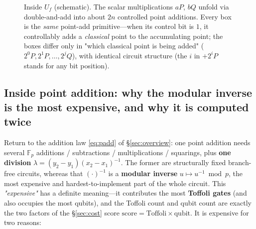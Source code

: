 \documentclass[11pt]{article}
\newcommand{\secref}[1]{\hyperref[#1]{\S\ref*{#1}}}
\begin{document}
\begin{figure}[h]
\centering
{}
\caption{Inside $U_f$ (schematic). The scalar multiplications $aP$, $bQ$ unfold via double-and-add into about $2n$ controlled point additions. Every box is the \emph{same}
point-add primitive---when its control bit is $1$, it controllably adds a \emph{classical} point to the accumulating point; the boxes differ only in "which classical point is being added" ($2^0P,2^1P,\dots,2^jQ$),
with identical circuit structure (the $i$ in $+2^iP$ stands for any bit position).}
\label{fig:oracle}
\end{figure}

\subsection{Inside point addition: why the modular inverse is the most expensive, and why it is computed twice}
\label{ssec:inv}

Return to the addition law \eqref{eq:padd} of \secref{sec:overview}: one point addition needs several $\mathbb{F}_p$ additions / subtractions / multiplications / squarings, plus \textbf{one division}
$\lambda=(y_2-y_1)(x_2-x_1)^{-1}$. The former are structurally fixed branch-free circuits, whereas that $(\cdot)^{-1}$ is a \textbf{modular inverse}
$u\mapsto u^{-1}\bmod p$, the most expensive and hardest-to-implement part of the whole circuit. This \emph{"expensive"} has a definite meaning---it contributes the most
\textbf{Toffoli gates} (and also occupies the most qubits), and the Toffoli count and qubit count are exactly the two factors of the \secref{sec:cost} score
$\text{score}=\text{Toffoli}\times\text{qubit}$. It is expensive for two reasons:
\end{document}
